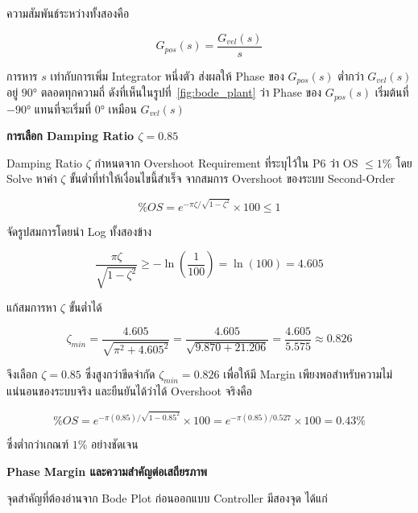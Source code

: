 ความสัมพันธ์ระหว่างทั้งสองคือ

\begin{equation}
  G_{pos}(s) = \frac{G_{vel}(s)}{s}
  \label{eq:gpos_gvel}
\end{equation}

การหาร $s$ เท่ากับการเพิ่ม Integrator หนึ่งตัว ส่งผลให้ Phase ของ 
$G_{pos}(s)$ ต่ำกว่า $G_{vel}(s)$ อยู่ $90°$ ตลอดทุกความถี่
ดังที่เห็นในรูปที่~\ref{fig:bode_plant} ว่า Phase ของ $G_{pos}(s)$ 
เริ่มต้นที่ $-90°$ แทนที่จะเริ่มที่ $0°$ เหมือน $G_{vel}(s)$

\textbf{การเลือก Damping Ratio $\zeta = 0.85$}

Damping Ratio $\zeta$ กำหนดจาก Overshoot Requirement ที่ระบุไว้ใน P6 
ว่า OS $\leq 1\%$ โดย Solve หาค่า $\zeta$ ขั้นต่ำที่ทำให้เงื่อนไขนี้สำเร็จ
จากสมการ Overshoot ของระบบ Second-Order

\begin{equation}
  \%OS = e^{-\pi\zeta/\sqrt{1-\zeta^2}} \times 100 \leq 1
  \label{eq:os_requirement}
\end{equation}

จัดรูปสมการโดยนำ Log ทั้งสองข้าง

\begin{equation}
  \frac{\pi\zeta}{\sqrt{1-\zeta^2}} \geq -\ln\!\left(\frac{1}{100}\right) 
  = \ln(100) = 4.605
  \label{eq:os_log}
\end{equation}

แก้สมการหา $\zeta$ ขั้นต่ำได้

\begin{equation}
  \zeta_{min} = \frac{4.605}{\sqrt{\pi^2 + 4.605^2}} 
              = \frac{4.605}{\sqrt{9.870 + 21.206}} 
              = \frac{4.605}{5.575} 
              \approx 0.826
  \label{eq:zeta_min}
\end{equation}

จึงเลือก $\zeta = 0.85$ ซึ่งสูงกว่าขีดจำกัด $\zeta_{min} = 0.826$ 
เพื่อให้มี Margin เพียงพอสำหรับความไม่แน่นอนของระบบจริง
และยืนยันได้ว่าได้ Overshoot จริงคือ

\begin{equation}
  \%OS = e^{-\pi(0.85)/\sqrt{1-0.85^2}} \times 100 
       = e^{-\pi(0.85)/0.527} \times 100 
       = 0.43\%
  \label{eq:os_verify}
\end{equation}

ซึ่งต่ำกว่าเกณฑ์ $1\%$ อย่างชัดเจน

\textbf{Phase Margin และความสำคัญต่อเสถียรภาพ}

จุดสำคัญที่ต้องอ่านจาก Bode Plot ก่อนออกแบบ Controller มีสองจุด ได้แก่

